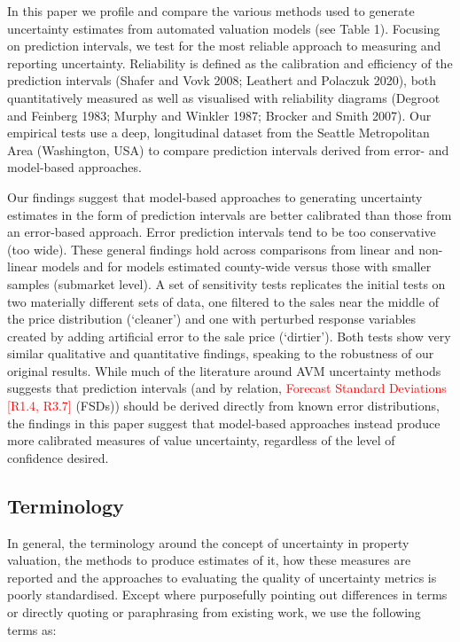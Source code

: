 \documentclass[colTwo]{anon}
\theoremstyle{definition}
\begin{document}
In this paper we profile and compare the various methods used to generate uncertainty estimates from automated valuation models (see Table 1). Focusing on prediction intervals, we test for the most reliable approach to measuring and reporting uncertainty.  Reliability is defined as the calibration and efficiency of the prediction intervals (Shafer and Vovk 2008; Leathert and Polaczuk 2020), both quantitatively measured as well as visualised with reliability diagrams (Degroot and Feinberg 1983; Murphy and Winkler 1987; Brocker and Smith 2007).  Our empirical tests use a deep, longitudinal dataset from the Seattle Metropolitan Area (Washington, USA) to compare prediction intervals derived from error- and model-based approaches. 

Our findings suggest that model-based approaches to generating uncertainty estimates in the form of prediction intervals are better calibrated than those from an error-based approach. Error prediction intervals tend to be too conservative (too wide).  These general findings hold across comparisons from linear and non-linear models and for models estimated county-wide versus those with smaller samples (submarket level).   A set of sensitivity tests replicates the initial tests on two materially different sets of data, one filtered to the sales near the middle of the price distribution (‘cleaner’) and one with perturbed response variables created by adding artificial error to the sale price (‘dirtier’).  Both tests show very similar qualitative and quantitative findings, speaking to the robustness of our original results.  While much of the literature around AVM uncertainty methods suggests that prediction intervals (and by relation, \textcolor{red}{Forecast Standard Deviations [R1.4, R3.7]} (FSDs)) should be derived directly from known error distributions, the findings in this paper suggest that model-based approaches instead produce more calibrated measures of value uncertainty, regardless of the level of confidence desired.  

\subsection{Terminology}

In general, the terminology around the concept of uncertainty in property valuation, the methods to produce estimates of it, how these measures are reported and the approaches to evaluating the quality of uncertainty metrics is poorly standardised.  Except where purposefully pointing out differences in terms or directly quoting or paraphrasing from existing work, we use the following terms as:
\end{document}
